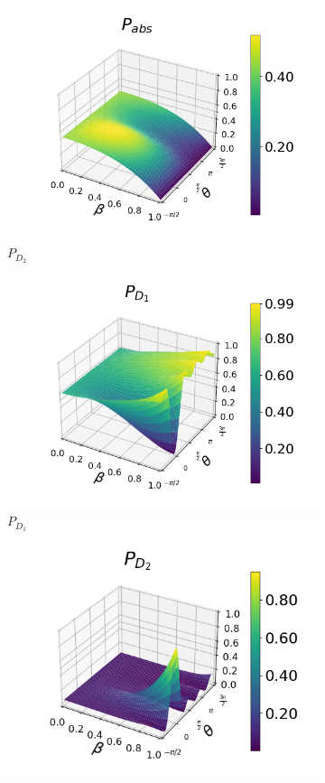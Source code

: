 \documentclass[12pt]{book}
\begin{document}
\begin{figure}[t!]
\begin{subfigure}[b]{0.3\linewidth}
\includegraphics[width=\linewidth]{images/pabs_3.png}
\caption{$P_{D_{2}}$ }
\label{fig:BS1}
\end{subfigure}
\begin{subfigure}[b]{0.3\linewidth}
\includegraphics[width=\linewidth]{images/pd1_5.png}
\caption{$P_{D_{1}}$ }
\label{fig:BS1}
\end{subfigure}
\begin{subfigure}[b]{0.3\linewidth}
\includegraphics[width=\linewidth]{images/pd2_5.png}

\end{subfigure}
\end{figure}
\end{document}
